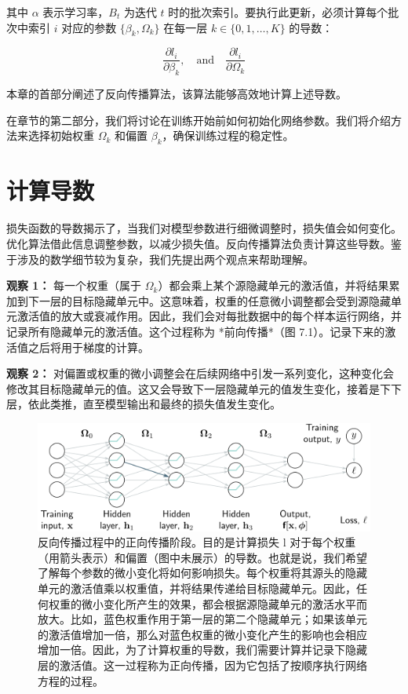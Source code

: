 其中 \(\alpha\) 表示学习率，\(B_t\) 为迭代 \(t\) 时的批次索引。要执行此更新，必须计算每个批次中索引 \(i\) 对应的参数 \(\{\beta_k, \Omega_k\}\) 在每一层 \(k \in \{0, 1, \ldots, K\}\) 的导数：

\begin{equation}
\frac{\partial l_i}{\partial \beta_k}, \quad \text{and} \quad \frac{\partial l_i}{\partial \Omega_k} 
\end{equation}

本章的首部分阐述了反向传播算法，该算法能够高效地计算上述导数。

在章节的第二部分，我们将讨论在训练开始前如何初始化网络参数。我们将介绍方法来选择初始权重 \(\Omega_k\) 和偏置 \(\beta_k\)，确保训练过程的稳定性。
\section{计算导数}

损失函数的导数揭示了，当我们对模型参数进行细微调整时，损失值会如何变化。优化算法借此信息调整参数，以减少损失值。反向传播算法负责计算这些导数。鉴于涉及的数学细节较为复杂，我们先提出两个观点来帮助理解。

\textbf{观察 1：} 每一个权重（属于 \(\Omega_k\)）都会乘上某个源隐藏单元的激活值，并将结果累加到下一层的目标隐藏单元中。这意味着，权重的任意微小调整都会受到源隐藏单元激活值的放大或衰减作用。因此，我们会对每批数据中的每个样本运行网络，并记录所有隐藏单元的激活值。这个过程称为 *前向传播*（图 7.1）。记录下来的激活值之后将用于梯度的计算。

\textbf{观察 2：} 对偏置或权重的微小调整会在后续网络中引发一系列变化，这种变化会修改其目标隐藏单元的值。这又会导致下一层隐藏单元的值发生变化，接着是下下层，依此类推，直至模型输出和最终的损失值发生变化。

\begin{figure}[ht!]
\centering
\includegraphics[width=0.7\linewidth]{png/chapter7/Train2BPIntuitions.png}
\caption{反向传播过程中的正向传播阶段。目的是计算损失 l 对于每个权重（用箭头表示）和偏置（图中未展示）的导数。也就是说，我们希望了解每个参数的微小变化将如何影响损失。每个权重将其源头的隐藏单元的激活值乘以权重值，并将结果传递给目标隐藏单元。因此，任何权重的微小变化所产生的效果，都会根据源隐藏单元的激活水平而放大。比如，蓝色权重作用于第一层的第二个隐藏单元；如果该单元的激活值增加一倍，那么对蓝色权重的微小变化产生的影响也会相应增加一倍。因此，为了计算权重的导数，我们需要计算并记录下隐藏层的激活值。这一过程称为正向传播，因为它包括了按顺序执行网络方程的过程。}
\end{figure}

